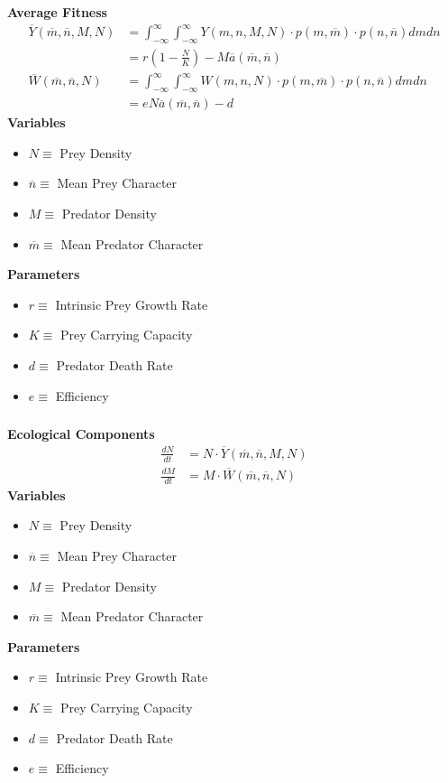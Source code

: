 \documentclass[10pt]{beamer}
\begin{document}
\begin{frame}
	\frametitle{}
	{\bf Average Fitness}
	\begin{align*}
	\overline{Y}(\overline{m}, \overline{n}, M, N) &= \int_{-\infty}^{\infty}\int_{-\infty}^{\infty} Y(m, n, M, N) \cdot p(m, \overline{m}) \cdot p(n, \overline{n}) dm dn \\
	&= r\left(1 - \frac{N}{K}\right) - M\overline{a}(\overline{m}, \overline{n}) \\[.1cm]
	\overline{W}(\overline{m}, \overline{n}, N) &= \int_{-\infty}^{\infty}\int_{-\infty}^{\infty} W(m, n, N) \cdot p(m, \overline{m}) \cdot p(n, \overline{n}) dm dn \\
	&= eN\overline{a}(\overline{m}, \overline{n}) - d
	\end{align*}
	{\bf Variables}
	\begin{itemize}
		\item $N \equiv $ Prey Density
		\item $\overline{n} \equiv $ Mean Prey Character
		\item $M \equiv $ Predator Density
		\item $\overline{m} \equiv $ Mean Predator Character
	\end{itemize}
	{\bf Parameters}
	\begin{itemize}
		\item $r \equiv $ Intrinsic Prey Growth Rate
		\item $K \equiv $ Prey Carrying Capacity
		\item $d \equiv $ Predator Death Rate
		\item $e \equiv $ Efficiency
	\end{itemize}
\end{frame}
\begin{frame}
	\frametitle{}
	{\bf Ecological Components}
	\begin{align*}
		\frac{dN}{dt} &= N\cdot \overline{Y}(\overline{m}, \overline{n}, M, N)\\[.1cm]
		\frac{dM}{dt} &= M\cdot \overline{W}(\overline{m}, \overline{n}, N)
	\end{align*}
	{\bf Variables}
	\begin{itemize}
		\item $N \equiv $ Prey Density
		\item $\overline{n} \equiv $ Mean Prey Character
		\item $M \equiv $ Predator Density
		\item $\overline{m} \equiv $ Mean Predator Character
	\end{itemize}
	{\bf Parameters}
	\begin{itemize}
		\item $r \equiv $ Intrinsic Prey Growth Rate
		\item $K \equiv $ Prey Carrying Capacity
		\item $d \equiv $ Predator Death Rate
		\item $e \equiv $ Efficiency
	\end{itemize}
\end{frame}
\end{document}
